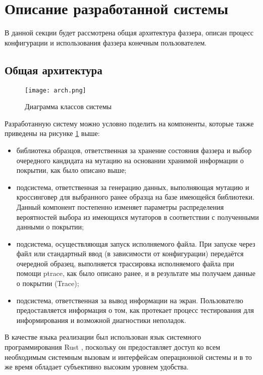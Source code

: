 \section{Описание разработанной системы}

В данной секции будет рассмотрена общая архитектура фаззера, описан процесс конфигурации и использования фаззера конечным пользователем.

\subsection{Общая архитектура}

\begin{figure}[h]
	\centering
	\texttt{[image: arch.png]}
	\caption{Диаграмма классов системы}
	\label{fig:arch}
\end{figure}%

Разработанную систему можно условно поделить на компоненты, которые также приведены на рисунке \ref{fig:arch} выше:
\begin{itemize}
	\item библиотека образцов, ответственная за хранение состояния фаззера и выбор очередного кандидата на мутацию на основании хранимой информации о покрытии, как было описано выше;
	
	\item подсистема, ответственная за генерацию данных, выполняющая мутацию и кроссинговер для выбранного ранее образца на базе имеющейся библиотеки. Данный компонент постепенно изменяет параметры распределения вероятностей выбора из имеющихся мутаторов в соответствии с полученными данными о покрытии;
	
	\item подсистема, осуществляющая запуск исполняемого файла. При запуске через файл или стандартный ввод (в зависимости от конфигурации) передаётся очередной образец, выполняется трассировка исполняемого файла при помощи ptrace, как было описано ранее, и в результате мы получаем данные о покрытии (Trace);
	
	\item подсистема, ответственная за вывод информации на экран. Пользователю предоставляется информация о том, как протекает процесс тестирования для информирования и возможной диагностики неполадок.
	
\end{itemize}

В качестве языка реализации был использован язык системного программирования Rust \cite{rust}, поскольку он предоставляет доступ ко всем необходимым системным вызовам и интерфейсам операционной системы и в то же время обладает субъективно высоким уровнем удобства.

